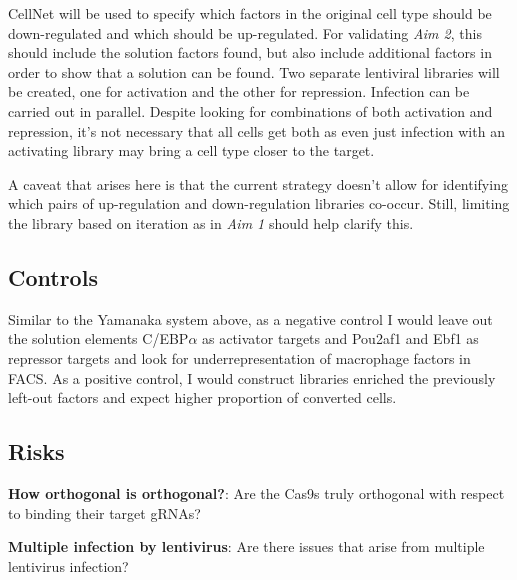 \documentclass[10pt]{article}
\begin{document}
CellNet will be used to specify which factors in the original cell type should be down-regulated and which should be up-regulated. For validating \textit{Aim 2}, this should include the solution factors found, but also include additional factors in order to show that a solution can be found. Two separate lentiviral libraries will be created, one for activation and the other for repression. Infection can be carried out in parallel. Despite looking for combinations of both activation and repression, it's not necessary that all cells get both as even just infection with an activating library may bring a cell type closer to the target.

A caveat that arises here is that the current strategy doesn't allow for identifying which pairs of up-regulation and down-regulation libraries co-occur. Still, limiting the library based on iteration as in \textit{Aim 1} should help clarify this.

\subsection{Controls}

Similar to the Yamanaka system above, as a negative control I would leave out the solution elements C/EBP$\alpha$ as activator targets and Pou2af1 and Ebf1 as repressor targets and look for underrepresentation of macrophage factors in FACS. As a positive control, I would construct libraries enriched the previously left-out factors and expect higher proportion of converted cells.

\subsection{Risks}

\noindent \textbf{How orthogonal is orthogonal?}: Are the Cas9s truly orthogonal with respect to binding their target gRNAs?
\newline

\noindent \textbf{Multiple infection by lentivirus}: Are there issues that arise from multiple lentivirus infection?



\end{document}
